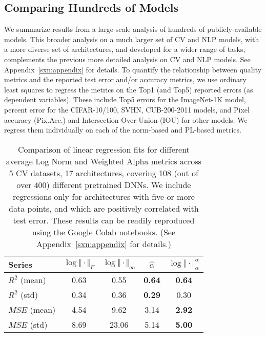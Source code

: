 \subsection{Comparing Hundreds of Models}
\label{sxn:all_cv_models}

We summarize results from a large-scale analysis of hundreds of publicly-available  models.
This broader analysis on a much larger set of CV and NLP models, with a more diverse set of architectures, and developed for a wider range of tasks, complements the previous more detailed analysis on CV and NLP models.
See Appendix~\ref{sxn:appendix} for details.
To quantify the relationship between quality metrics and the reported test error and/or accuracy metrics, we use ordinary least squares to regress the metrics on the Top1 (and Top5) reported errors (as dependent variables).
These include Top5 errors for the ImageNet-1K model, percent error for the CIFAR-10/100, SVHN, CUB-200-2011 models, and Pixel accuracy (Pix.Acc.) and Intersection-Over-Union (IOU) for other models.
We regress them individually on each of the norm-based and PL-based metrics.


\begin{table}[t]
\small
\begin{center}
\begin{tabular}{|p{1in}|c|c|c|c|}
\hline
Series        & $\log\Vert\cdot\Vert_{F}$ & $\log\Vert\cdot\Vert_{\infty}$ & $\hat{\alpha}$ & $\log\Vert\cdot\Vert^{\alpha}_{\alpha}$ \\
\hline
$R^{2}$ (mean) & 0.63 &  0.55 & \textbf{0.64} & \textbf{0.64} \\
$R^{2}$ (std)  & 0.34 &  0.36 & \textbf{0.29} &          0.30 \\
\hline
$MSE$ (mean)   & 4.54 &  9.62 &          3.14 & \textbf{2.92} \\
$MSE$ (std)    & 8.69 & 23.06 &          5.14 & \textbf{5.00} \\
\hline
\end{tabular}
\end{center}
\caption{Comparison of linear regression fits for different average Log Norm and Weighted Alpha metrics across 5 CV datasets, 17 architectures, covering 108 (out of over 400) different pretrained DNNs.  
         We include regressions only for architectures with five or more data points, and which are positively correlated with test error.
         These results can be readily reproduced using the Google Colab notebooks. (See Appendix~\ref{sxn:appendix} for details.) 
        }
\label{table:results}
\end{table}


